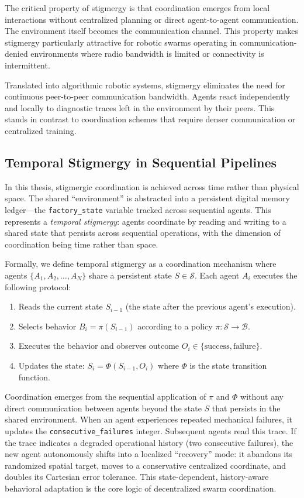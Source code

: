 \documentclass[12pt,a4paper,oneside]{report}
\begin{document}
The critical property of stigmergy is that coordination emerges from local interactions without centralized planning or direct agent-to-agent communication. The environment itself becomes the communication channel. This property makes stigmergy particularly attractive for robotic swarms operating in communication-denied environments where radio bandwidth is limited or connectivity is intermittent.

Translated into algorithmic robotic systems, stigmergy eliminates the need for continuous peer-to-peer communication bandwidth. Agents react independently and locally to diagnostic traces left in the environment by their peers. This stands in contrast to coordination schemes that require denser communication or centralized training.

\subsection{Temporal Stigmergy in Sequential Pipelines}

In this thesis, stigmergic coordination is achieved across time rather than physical space. The shared ``environment'' is abstracted into a persistent digital memory ledger---the \texttt{factory\_state} variable tracked across sequential agents. This represents a \textit{temporal stigmergy}: agents coordinate by reading and writing to a shared state that persists across sequential operations, with the dimension of coordination being time rather than space.

Formally, we define temporal stigmergy as a coordination mechanism where agents $\{A_1, A_2, \ldots, A_N\}$ share a persistent state $S \in \mathcal{S}$. Each agent $A_i$ executes the following protocol:

\begin{enumerate}
    \item Reads the current state $S_{i-1}$ (the state after the previous agent's execution).
    \item Selects behavior $B_i = \pi(S_{i-1})$ according to a policy $\pi: \mathcal{S} \rightarrow \mathcal{B}$.
    \item Executes the behavior and observes outcome $O_i \in \{\text{success}, \text{failure}\}$.
    \item Updates the state: $S_i = \Phi(S_{i-1}, O_i)$ where $\Phi$ is the state transition function.
\end{enumerate}

Coordination emerges from the sequential application of $\pi$ and $\Phi$ without any direct communication between agents beyond the state $S$ that persists in the shared environment. When an agent experiences repeated mechanical failures, it updates the \texttt{consecutive\_failures} integer. Subsequent agents read this trace. If the trace indicates a degraded operational history (two consecutive failures), the new agent autonomously shifts into a localized ``recovery'' mode: it abandons its randomized spatial target, moves to a conservative centralized coordinate, and doubles its Cartesian error tolerance. This state-dependent, history-aware behavioral adaptation is the core logic of decentralized swarm coordination.
\end{document}
